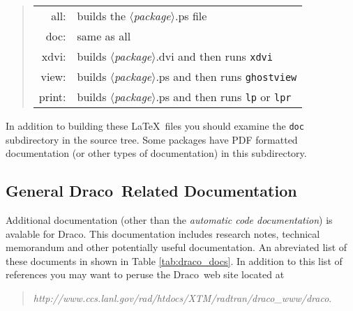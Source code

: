 \documentclass[11pt]{nmemo}
\newcommand{\comp}[1]{\normalfont\normalsize\texttt{#1}}
\newcommand{\draco}{{\normalfont\sffamily Draco}}
\begin{document}
\begin{quote}
\begin{tabular}{rl}
all:    &  builds the $\langle$\emph{package}$\rangle$.ps file \\
doc:    &  same as all \\
xdvi:   &  builds $\langle$\emph{package}$\rangle$.dvi and then runs \comp{xdvi} \\
view:   &  builds $\langle$\emph{package}$\rangle$.ps and then runs \comp{ghostview} \\
print:  &  builds $\langle$\emph{package}$\rangle$.ps and then runs \comp{lp} or \comp{lpr}
\end{tabular}
\end{quote}

In addition to building these \LaTeX\ files you should examine the
\comp{doc} subdirectory in the source tree.  Some packages have PDF
formatted documentation (or other types of documentation) in this
subdirectory. 


\subsection{General \draco\ Related Documentation}

Additional documentation (other than the \emph{automatic code
  documentation}) is avalable for \draco.  This documentation includes
research notes, technical memorandum and other potentially useful
documentation.  An abreviated list of these documents in shown in
Table \ref{tab:draco_docs}.  In addition to this list of references
you may want to peruse the \draco\ web site located at

\begin{quote}
\emph{http://www.ccs.lanl.gov/rad/htdocs/XTM/radtran/draco\_www/draco}.
\end{quote}
\end{document}
